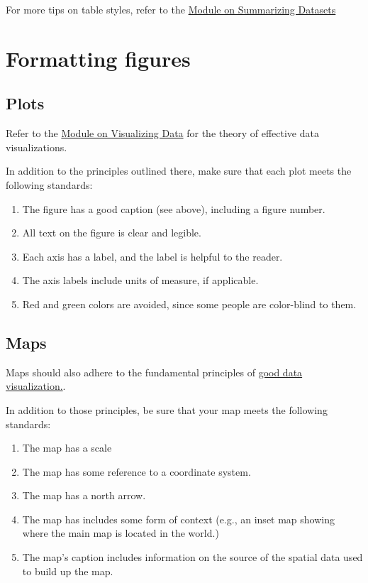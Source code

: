 \documentclass[
]{book}
\providecommand{\tightlist}{%
  \setlength{\itemsep}{0pt}\setlength{\parskip}{0pt}}
\begin{document}
For more tips on table styles, refer to the \protect\hyperlink{tables}{Module on Summarizing Datasets}

\hypertarget{formatting-figures}{%
\section*{Formatting figures}\label{formatting-figures}}

\hypertarget{plots}{%
\subsection*{Plots}\label{plots}}

Refer to the \protect\hyperlink{dataviz}{Module on Visualizing Data} for the theory of effective data visualizations.

In addition to the principles outlined there, make sure that each plot meets the following standards:

\begin{enumerate}
\def\labelenumi{\arabic{enumi}.}
\tightlist
\item
  The figure has a good caption (see above), including a figure number.\\
\item
  All text on the figure is clear and legible.
\item
  Each axis has a label, and the label is helpful to the reader.
\item
  The axis labels include units of measure, if applicable.
\item
  Red and green colors are avoided, since some people are color-blind to them.
\end{enumerate}

\hypertarget{maps}{%
\subsection*{Maps}\label{maps}}

Maps should also adhere to the fundamental principles of \protect\hyperlink{datavis}{good data visualization.}.

In addition to those principles, be sure that your map meets the following standards:

\begin{enumerate}
\def\labelenumi{\arabic{enumi}.}
\tightlist
\item
  The map has a scale\\
\item
  The map has some reference to a coordinate system.\\
\item
  The map has a north arrow.\\
\item
  The map has includes some form of context (e.g., an inset map showing where the main map is located in the world.)\\
\item
  The map's caption includes information on the source of the spatial data used to build up the map.
\end{enumerate}
\end{document}
